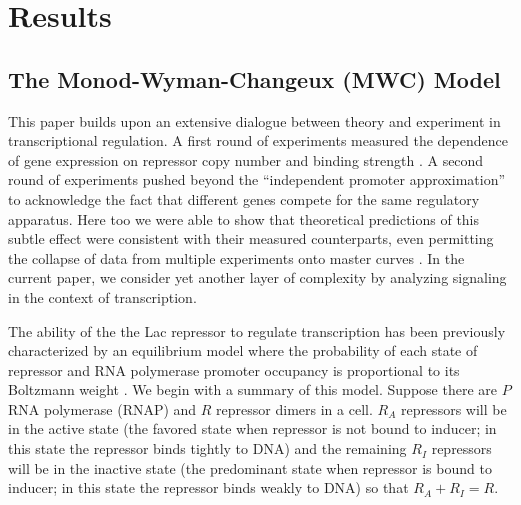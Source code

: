 \pagebreak
\section*{Results}

\subsection*{The Monod-Wyman-Changeux (MWC) Model }



This paper builds upon an extensive dialogue between theory and experiment in
transcriptional regulation. A first round of experiments measured the dependence
of gene expression on repressor copy number and binding strength
\cite{Garcia2011}. A second round of experiments pushed beyond the ``independent
promoter approximation'' to acknowledge the fact that different genes compete
for the same regulatory apparatus.  Here too we were able to show that
theoretical predictions of this subtle effect were consistent with their
measured counterparts, even permitting the collapse of data from multiple
experiments onto master curves \cite{Brewster2014, Weinert2014}. In the current
paper, we consider yet another layer of complexity by analyzing signaling in the
context of transcription.

The ability of the the Lac repressor to regulate transcription has been
previously characterized by an equilibrium model where the probability of each
state of repressor and RNA polymerase promoter occupancy is proportional to its Boltzmann
weight \cite{Daber2011a, Phillips2015a}. We begin with a summary of this model.
Suppose there are \(P\) RNA polymerase (RNAP) and \(R\) repressor dimers in a
cell. \(R_A\) repressors will be in the active state (the favored state when
repressor is not bound to inducer; in this state the repressor binds tightly to
DNA) and the remaining \(R_I\) repressors will be in the inactive state (the
predominant state when repressor is bound to inducer; in this state the
repressor binds weakly to DNA) so that \(R_A+R_I=R\). 


